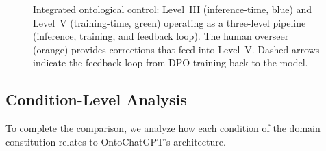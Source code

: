 \documentclass[11pt]{article}
\begin{document}
\begin{figure}[h]
\caption{Integrated ontological control: Level~III (inference-time, blue) and Level~V (training-time, green) operating as a three-level pipeline (inference, training, and feedback loop).
The human overseer (orange) provides corrections that feed into Level~V.
Dashed arrows indicate the feedback loop from DPO training back to the model.}
\label{fig:integration}
\end{figure}

\subsection{Condition-Level Analysis}
\label{sec:condition-analysis}

To complete the comparison, we analyze how each condition of the domain constitution relates to OntoChatGPT's architecture.
\end{document}
